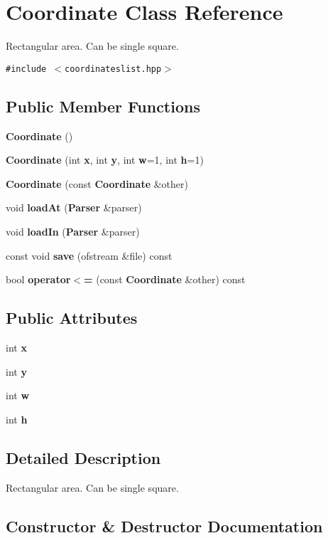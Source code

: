 \section{Coordinate Class Reference}
\label{classCoordinate}
Rectangular area. Can be single square.  


{\tt \#include $<$coordinateslist.hpp$>$}

\subsection*{Public Member Functions}
\begin{CompactItemize}
\item 
{\bf Coordinate} ()
\item 
{\bf Coordinate} (int {\bf x}, int {\bf y}, int {\bf w}=1, int {\bf h}=1)
\item 
{\bf Coordinate} (const {\bf Coordinate} \&other)
\item 
void {\bf load\-At} ({\bf Parser} \&parser)
\item 
void {\bf load\-In} ({\bf Parser} \&parser)
\item 
const void {\bf save} (ofstream \&file) const 
\item 
bool {\bf operator$<$=} (const {\bf Coordinate} \&other) const 
\end{CompactItemize}
\subsection*{Public Attributes}
\begin{CompactItemize}
\item 
int {\bf x}
\item 
int {\bf y}
\item 
int {\bf w}
\item 
int {\bf h}
\end{CompactItemize}


\subsection{Detailed Description}
Rectangular area. Can be single square. 



\subsection{Constructor \& Destructor Documentation}
